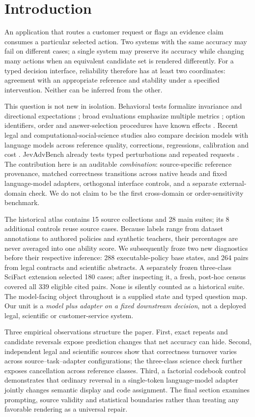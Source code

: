 \section{Introduction}
An application that routes a customer request or flags an evidence claim consumes a particular selected action. Two systems with the same accuracy may fail on different cases; a single system may preserve its accuracy while changing many actions when an equivalent candidate set is rendered differently. For a typed decision interface, reliability therefore has at least two coordinates: agreement with an appropriate reference and stability under a specified intervention. Neither can be inferred from the other.

This question is not new in isolation. Behavioral tests formalize invariance and directional expectations \citep{checklist}; broad evaluations emphasize multiple metrics \citep{helm}; option identifiers, order and answer-selection procedures have known effects \citep{mcq,benchmarksensitivity,firsttoken}. Recent legal and computational-social-science studies also compare decision models with language models across reference quality, corrections, regressions, calibration and cost \citep{legaldecisions,cssdecisions}. JevAdvBench already tests typed perturbations and repeated requests \citep{jevadvbench}. The contribution here is an auditable \emph{combination}: source-specific reference provenance, matched correctness transitions across native heads and fixed language-model adapters, orthogonal interface controls, and a separate external-domain check. We do not claim to be the first cross-domain or order-sensitivity benchmark.

The historical atlas contains 15 source collections and 28 main suites; its 8 additional controls reuse source cases. Because labels range from dataset annotations to authored policies and synthetic teachers, their percentages are never averaged into one ability score. We subsequently froze two new diagnostics before their respective inference: 288 executable-policy base states, and 264 pairs from legal contracts and scientific abstracts. A separately frozen three-class SciFact extension selected 180 cases; after inspecting it, a fresh, post-hoc census covered all 339 eligible cited pairs. None is silently counted as a historical suite. The model-facing object throughout is a supplied state and typed question map. Our unit is a \emph{model plus adapter on a fixed downstream decision}, not a deployed legal, scientific or customer-service system.

Three empirical observations structure the paper. First, exact repeats and candidate reversals expose prediction changes that net accuracy can hide. Second, independent legal and scientific sources show that correctness turnover varies across source--task--adapter configurations; the three-class science check further exposes cancellation across reference classes. Third, a factorial codebook control demonstrates that ordinary reversal in a single-token language-model adapter jointly changes semantic display and code assignment. The final section examines prompting, source validity and statistical boundaries rather than treating any favorable rendering as a universal repair.

